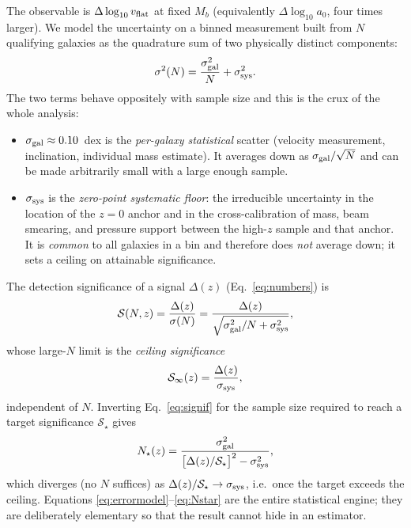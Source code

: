 \documentclass[fleqn,usenatbib]{mnras}
\newcommand{\dlogv}{\Delta\log_{10} v_{\rm flat}}
\newcommand{\azero}{a_0}
\newcommand{\sgal}{\sigma_{\rm gal}}
\newcommand{\ssys}{\sigma_{\rm sys}}
\begin{document}
The observable is $\dlogv$ at fixed $M_b$ (equivalently $\Delta\log_{10}\azero$,
four times larger). We model the uncertainty on a binned measurement built from $N$
qualifying galaxies as the quadrature sum of two physically distinct components:
\begin{equation}
\sigma^2(N) = \frac{\sgal^2}{N} + \ssys^2 .
\label{eq:errormodel}
\end{equation}
The two terms behave oppositely with sample size and this is the crux of the whole
analysis:
\begin{itemize}
\item $\sgal\approx0.10$~dex is the \emph{per-galaxy statistical} scatter (velocity
measurement, inclination, individual mass estimate). It averages down as
$\sgal/\sqrt N$ and can be made arbitrarily small with a large enough sample.
\item $\ssys$ is the \emph{zero-point systematic floor}: the irreducible uncertainty
in the location of the $z=0$ anchor and in the cross-calibration of mass, beam
smearing, and pressure support between the high-$z$ sample and that anchor. It is
\emph{common} to all galaxies in a bin and therefore does \emph{not} average down;
it sets a ceiling on attainable significance.
\end{itemize}
The detection significance of a signal $\Delta(z)$ (Eq.~\ref{eq:numbers}) is
\begin{equation}
\mathcal{S}(N,z)=\frac{\Delta(z)}{\sigma(N)}
=\frac{\Delta(z)}{\sqrt{\sgal^2/N+\ssys^2}} ,
\label{eq:signif}
\end{equation}
whose large-$N$ limit is the \emph{ceiling significance}
\begin{equation}
\mathcal{S}_\infty(z)=\frac{\Delta(z)}{\ssys},
\label{eq:ceiling}
\end{equation}
independent of $N$. Inverting Eq.~\eqref{eq:signif} for the sample size required to
reach a target significance $\mathcal{S}_\star$ gives
\begin{equation}
N_\star(z)=\frac{\sgal^2}{\big[\Delta(z)/\mathcal{S}_\star\big]^2-\ssys^2},
\label{eq:Nstar}
\end{equation}
which diverges (no $N$ suffices) as $\Delta(z)/\mathcal{S}_\star\to\ssys$, i.e.\ once
the target exceeds the ceiling. Equations \eqref{eq:errormodel}--\eqref{eq:Nstar}
are the entire statistical engine; they are deliberately elementary so that the
result cannot hide in an estimator.
\end{document}
